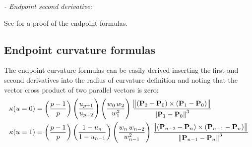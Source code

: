 \textit{- Endpoint second derivative:} \\

See \textcite[pp.~117--127]{NURBS_book} for a proof of the endpoint formulas.  


\subsection{Endpoint curvature formulas}
The endpoint curvature formulas can be easily derived inserting the first and second derivatives into the radius of curvature definition and noting that the vector cross product of two parallel vectors is zero:
\begin{align}
    \label{eq:nurbs_curvature_u0}
    \kappa(u=0) &=  \left( \frac{p-1}{p}  \right)  \left( \frac{u_{p+1}}{u_{p+2}}  \right) \left(\frac{w_{0}\,w_{2}}{w_{1}^2} \right)  \,
    \frac{\norm{ \left(\mathbf{P}_{2}-\mathbf{P}_{0}\right) \times \left(\mathbf{P}_{1}-\mathbf{P}_{0}\right)} }{\norm{\mathbf{P}_{1}-\mathbf{P}_{0}}^3} \\
    \label{eq:nurbs_curvature_u1}
    \kappa(u=1) &=  \left( \frac{p-1}{p}  \right)  \left( \frac{1-u_{n}}{1-u_{n-1}}  \right) \left(\frac{w_{n}\,w_{n-2}}{w_{n-1}^2} \right)  \,
    \frac{\norm{ \left(\mathbf{P}_{n-2}-\mathbf{P}_{n}\right) \times \left(\mathbf{P}_{n-1}-\mathbf{P}_{n}\right)} }{\norm{\mathbf{P}_{n-1}-\mathbf{P}_{n}}^3}
\end{align}

